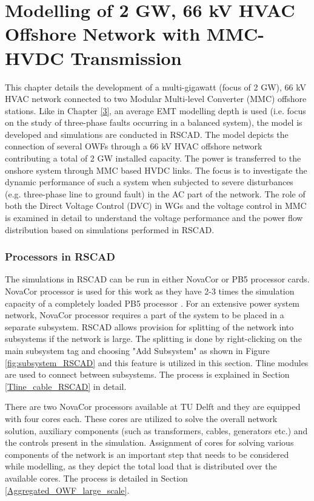 \chapter{Modelling of 2 GW, 66 kV HVAC Offshore Network with MMC-HVDC Transmission}\label{4}
This chapter details the development of a multi-gigawatt (focus of 2 GW), 66 kV \gls{HVAC} network connected to two Modular Multi-level Converter (\gls{MMC}) offshore stations. Like in Chapter \ref{3}, an average \gls{EMT} modelling depth is used (i.e. focus on the study of three-phase faults occurring in a balanced system), the model is developed and simulations are conducted in RSCAD. The model depicts the connection of several \gls{OWF}s through a 66 kV \gls{HVAC} offshore network contributing a total of 2 GW installed capacity. The power is transferred to the onshore system through \gls{MMC} based \gls{HVDC} links. The focus is to investigate the dynamic performance of such a system when subjected to severe disturbances (e.g. three-phase line to ground fault) in the \gls{AC} part of the network. The role of both the Direct Voltage Control (\gls{DVC}) in \gls{WG}s and the voltage control in \gls{MMC} is examined in detail to understand the voltage performance and the power flow distribution based on simulations performed in RSCAD. %

\subsection{Processors in RSCAD}\label{split_system}
The simulations in RSCAD can be run in either NovaCor or PB5 processor cards. NovaCor processor is used for this work as they have 2-3 times the simulation capacity of a completely loaded PB5 processor \cite{noauthor_novacor_nodate}. For an extensive power system network, NovaCor processor requires a part of the system to be placed in a separate subsystem. RSCAD allows provision for splitting of the network into subsystems if the network is large. The splitting is done by right-clicking on the main subsystem tag and choosing "Add Subsystem" as shown in Figure \ref{fig:subsystem_RSCAD} and this feature is utilized in this section. Tline modules are used to connect between subsystems. The process is explained in Section \ref{Tline_cable_RSCAD} in detail.

There are two NovaCor processors available at TU Delft and they are equipped with four cores each. These cores are utilized to solve the overall network solution, auxiliary components (such as transformers, cables, generators etc.) and the controls present in the simulation. Assignment of cores for solving various components of the network is an important step that needs to be considered while modelling, as they depict the total load that is distributed over the available cores. The process is detailed in Section \ref{Aggregated_OWF_large_scale}. 

